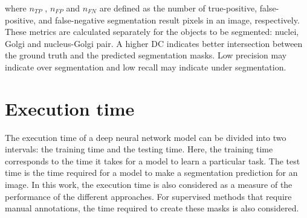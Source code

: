 \noindent where $n_{TP}$ , $n_{FP}$ and $n_{FN}$ are defined as the number of true-positive, false-positive, and false-negative segmentation result pixels in an image, respectively. These metrics are calculated separately for the objects to be segmented: nuclei, Golgi and nucleus-Golgi pair. A higher \ac{DC} indicates better intersection between the ground truth and the predicted segmentation masks. Low precision may indicate over segmentation and low recall may indicate under segmentation.

\section{Execution time}
\label{section:execution_time}

The execution time of a deep neural network model can be divided into two intervals: the training time and the testing time. Here, the training time corresponds to the time it takes for a model to learn a particular task. The test time is the time required for a model to make a segmentation prediction for an image. In this work, the execution time is also considered as a measure of the performance of the different approaches. For supervised methods that require manual annotations, the time required to create these masks is also considered.